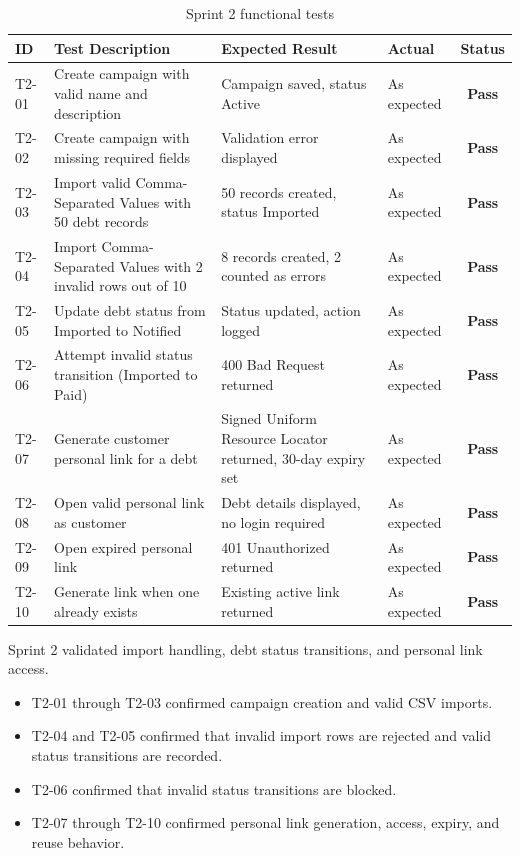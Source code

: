 ﻿\documentclass[12pt,a4paper]{report}
\newcommand{\reporttablesetup}{%
  \small%
  \microtypesetup{activate=false}%
  \setlength{\tabcolsep}{5pt}%
  \renewcommand{\arraystretch}{1.38}%
  \arrayrulecolor{framegray}%
}
\newcommand{\tpass}{\textcolor{passgreen}{\textbf{Pass}}}
\begin{document}
\begin{table}[H]
  \centering
  \renewcommand{\arraystretch}{1.2}
  \footnotesize\reporttablesetup
  \begin{tabular}{|I|L{5.6cm}|L{3.0cm}|L{2.2cm}|C|}
    \hline
    \textbf{ID} & \textbf{Test Description} & \textbf{Expected Result} & \textbf{Actual} & \textbf{Status} \\
    \hline
    T2-01 & Create campaign with valid name and description  & Campaign saved, status Active          & As expected & \tpass \\
    \hline
    T2-02 & Create campaign with missing required fields     & Validation error displayed             & As expected & \tpass \\
    \hline
    T2-03 & Import valid Comma-Separated Values with 50 debt records            & 50 records created, status Imported    & As expected & \tpass \\
    \hline
    T2-04 & Import Comma-Separated Values with 2 invalid rows out of 10        & 8 records created, 2 counted as errors & As expected & \tpass \\
    \hline
    T2-05 & Update debt status from Imported to Notified     & Status updated, action logged          & As expected & \tpass \\
    \hline
    T2-06 & Attempt invalid status transition (Imported to Paid) & 400 Bad Request returned           & As expected & \tpass \\
    \hline
    T2-07 & Generate customer personal link for a debt       & Signed Uniform Resource Locator returned, 30-day expiry set & As expected & \tpass \\
    \hline
    T2-08 & Open valid personal link as customer             & Debt details displayed, no login required & As expected & \tpass \\
    \hline
    T2-09 & Open expired personal link                       & 401 Unauthorized returned              & As expected & \tpass \\
    \hline
    T2-10 & Generate link when one already exists            & Existing active link returned          & As expected & \tpass \\
    \hline
  \end{tabular}
  \caption{Sprint 2 functional tests}
  \label{tab:test-s2}
\end{table}
\noindent Sprint 2 validated import handling, debt status transitions, and personal link access.

\begin{itemize}
  \item T2-01 through T2-03 confirmed campaign creation and valid CSV imports.
  \item T2-04 and T2-05 confirmed that invalid import rows are rejected and valid status transitions are recorded.
  \item T2-06 confirmed that invalid status transitions are blocked.
  \item T2-07 through T2-10 confirmed personal link generation, access, expiry, and reuse behavior.
\end{itemize}
\end{document}
